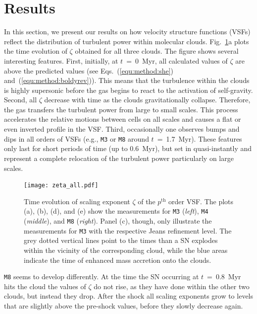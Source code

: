 \section{Results}\label{results}

In this section, we present our results on how velocity structure functions (VSFs) reflect the distribution of turbulent power within molecular clouds.
Fig.~\ref{pic:results:zeta_all}a plots the time evolution of $\zeta$ obtained for all three clouds.
The figure shows several interesting features.
First, initially, at $t$~=~0~Myr, all calculated values of $\zeta$ are above the predicted values (see Eqs.~(\ref{equ:method:she}) and~(\ref{equ:method:boldyrev})).
This means that the turbulence within the clouds is highly supersonic before the gas begins to react to the activation of self-gravity.
Second, all $\zeta$ decrease with time as the clouds gravitationally collapse.
Therefore, the gas transfers the turbulent power from large to small scales.
This process accelerates the relative motions between cells on all scales and causes a flat or even inverted profile in the VSF.
Third, occasionally one observes bumps and dips in all orders of VSFs (e.g., \texttt{M3} or \texttt{M8} around $t$~=~1.7~Myr). 
These features only last for short periods of time (up to 0.6~Myr), but set in quasi-instantly and represent a complete relocation of the turbulent power particularly on large scales. 

\begin{figure}[!htb]
	\centering
	\texttt{[image: zeta\_all.pdf]}
	\caption{ Time evolution of scaling exponent $\zeta$ of the $p^\mathrm{th}$ order VSF. The plots (a), (b), (d), and (e) show the measurements for \texttt{M3} (\textit{left}), \texttt{M4} (\textit{middle}), and \texttt{M8} (\textit{right}). Panel (c), though, only illustrate the measurements for \texttt{M3} with the respective Jeans refinement level. The grey dotted vertical lines point to the times than a SN explodes within the vicinity of the corresponding cloud, while the blue areas indicate the time of enhanced mass accretion onto the clouds. }
	\label{pic:results:zeta_all}
\end{figure}

\texttt{M8} seems to develop differently.
At the time the SN occurring at $t$~=~0.8~Myr hits the cloud the values of $\zeta$ do not rise, as they have done within the other two clouds, but instead they drop. 
After the shock all scaling exponents grow to levels that are slightly above the pre-shock values, before they slowly decrease again.

